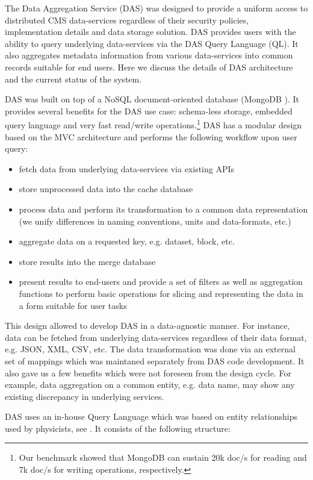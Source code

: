 
The Data Aggregation Service (DAS) \cite{DAS} was designed to provide a uniform
access to distributed CMS data-services regardless of their security policies,
implementation details and data storage solution. DAS provides users with the ability to
query underlying data-services via the DAS Query Language (QL). It also aggregates
metadata information from various data-services into common records
suitable for end users. Here we discuss the details of DAS architecture and the
current status of the system.

DAS was built on top of a NoSQL document-oriented database (MongoDB
\cite{MongoDB}). It provides several benefits for the DAS use case: schema-less
storage, embedded query language and very fast read/write
operations.\footnote{Our benchmark showed that MongoDB can sustain 20k doc/s
for reading and 7k doc/s for writing operations, respectively.}
DAS has a modular design based on the MVC architecture \cite{MVC} and performs the
following workflow upon user query:

\begin{itemize}
\item fetch data from underlying data-services via existing APIs
\item store unprocessed data into the cache database
\item process data and perform its transformation to a common data representation
(we unify differences in naming conventions, units and data-formats, etc.)
\item aggregate data on a requested key, e.g. dataset, block, etc.
\item store results into the merge database
\item present results to end-users and provide a set of filters as well as
aggregation functions to perform basic operations for slicing and representing
the data in a form suitable for user tasks
\end{itemize}

This design allowed to develop DAS in a data-agnostic manner. For instance,
data can be fetched from underlying data-services regardless of their data format, e.g.
JSON, XML, CSV, etc. The data transformation was done via an external set of
mappings which was maintaned separately from DAS code development. It also gave
us a few benefits which were not foreseen from the design cycle. For example,
data aggregation on a common entity, e.g. data name, may show any existing discrepancy in
underlying services.

DAS uses an in-house Query Language which was based on entity relationships used by
physicists, see \cite{DAS}. It consists of the following structure:

